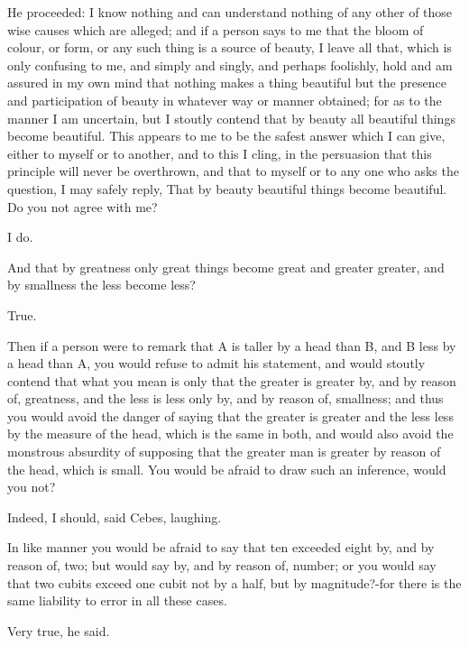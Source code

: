 He proceeded: I know nothing and can understand nothing of any other of
those wise causes which are alleged; and if a person says to me that
the bloom of colour, or form, or any such thing is a source of beauty,
I leave all that, which is only confusing to me, and simply and singly,
and perhaps foolishly, hold and am assured in my own mind that nothing
makes a thing beautiful but the presence and participation of beauty in
whatever way or manner obtained; for as to the manner I am uncertain,
but I stoutly contend that by beauty all beautiful things become
beautiful. This appears to me to be the safest answer which I can give,
either to myself or to another, and to this I cling, in the persuasion
that this principle will never be overthrown, and that to myself or
to any one who asks the question, I may safely reply, That by beauty
beautiful things become beautiful. Do you not agree with me?

I do.

And that by greatness only great things become great and greater
greater, and by smallness the less become less?

True.

Then if a person were to remark that A is taller by a head than B, and
B less by a head than A, you would refuse to admit his statement, and
would stoutly contend that what you mean is only that the greater is
greater by, and by reason of, greatness, and the less is less only by,
and by reason of, smallness; and thus you would avoid the danger of
saying that the greater is greater and the less less by the measure of
the head, which is the same in both, and would also avoid the monstrous
absurdity of supposing that the greater man is greater by reason of the
head, which is small. You would be afraid to draw such an inference,
would you not?

Indeed, I should, said Cebes, laughing.

In like manner you would be afraid to say that ten exceeded eight by,
and by reason of, two; but would say by, and by reason of, number; or
you would say that two cubits exceed one cubit not by a half, but by
magnitude?-for there is the same liability to error in all these cases.

Very true, he said.

